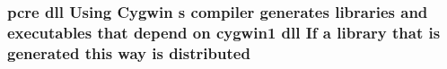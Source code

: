 \subsubsection[{\texorpdfstring{distributed}{distributed}}]{ {\bf pcre} dll Using Cygwin {\bf s} {\bf compiler} generates {\bf libraries} and executables that depend {\bf on} cygwin1 dll If {\bf a} {\bf library} that {\bf is} {\bf generated} {\bf this} {\bf way} {\bf is} distributed}\hypertarget{NON-AUTOTOOLS-BUILD_8txt_a8fcfde089eb2e2d386ab2ec6864fe14c}{}\label{NON-AUTOTOOLS-BUILD_8txt_a8fcfde089eb2e2d386ab2ec6864fe14c}
